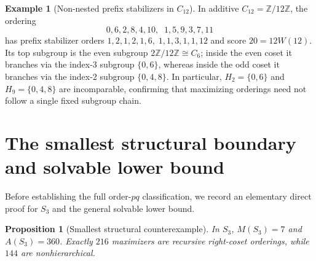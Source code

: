 \documentclass[11pt,reqno]{amsart}
\numberwithin{equation}{section}
\newtheorem{proposition}[theorem]{Proposition}
\theoremstyle{definition}
\newtheorem{example}[theorem]{Example}
\theoremstyle{remark}
\newcommand{\Z}{\mathbb{Z}}
\begin{document}
\begin{example}[Non-nested prefix stabilizers in $C_{12}$]
In additive $C_{12}=\Z/12\Z$, the ordering
\[
0, 6, 2, 8, 4, 10,\;\; 1, 5, 9, 3, 7, 11
\]
has prefix stabilizer orders $1,2,1,2,1,6,\; 1,1,3,1,1,12$ and score $20=12W(12)$. Its top subgroup is the even subgroup $2\Z/12\Z\cong C_6$; inside the even coset it branches via the index-$3$ subgroup $\{0,6\}$, whereas inside the odd coset it branches via the index-$2$ subgroup $\{0,4,8\}$. In particular, $H_2=\{0,6\}$ and $H_9=\{0,4,8\}$ are incomparable, confirming that maximizing orderings need not follow a single fixed subgroup chain.
\end{example}

\section{The smallest structural boundary and solvable lower bound}
\label{sec:boundary}

Before establishing the full order-$pq$ classification, we record an elementary direct proof for $S_3$ and the general solvable lower bound.

\begin{proposition}[Smallest structural counterexample]
\label{prop:S3}
In $S_3$, $M(S_3)=7$ and $A(S_3)=360$. Exactly $216$ maximizers are recursive right-coset orderings, while $144$ are nonhierarchical.
\end{proposition}
\end{document}
